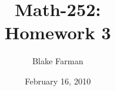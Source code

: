 \documentclass[10pt]{amsart}
\author{Blake Farman}
\title{Math-252:\\Homework 3}
\date{February 16, 2010}\pdfpagewidth 8.5in
\begin{document}
\maketitle

\newcommand{\Z}{\mathbb{Z}}
\newcommand{\R}{\mathbb{R}}
\newcommand{\Q}{\mathbb{Q}}

\renewcommand{\qedsymbol}{\(\blacksquare\)}
\newcommand{\znz}[1]{\Z / #1\Z}
\newcommand{\mznz}[1]{(\Z / #1\Z)^*}

\renewcommand{\phi}{\varphi}
\newenvironment{alphaenum}{
  \begin{enumerate}
    \renewcommand{\theenumi}{(\alph{enumi})}
    \renewcommand{\labelenumi}{\theenumi}
  }
  {\end{enumerate}}

\newcommand{\quadeq}[3]{\frac{-(#2) \pm \sqrt{(#2)^2 - 4(#1)(#3)}}{2(#3)}}
\newcommand{\F}{\mathbb{F}}
\newtheorem{thm}{}
\end{document}
